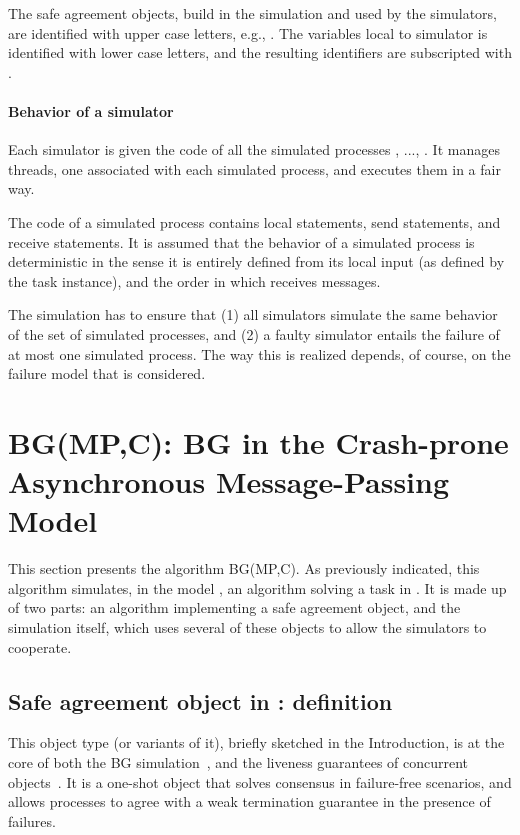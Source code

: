 \documentclass[11pt,letterpaper]{article}
\begin{document}
The safe agreement objects, build in the simulation and used by the simulators,
are identified with upper case letters, e.g., .  The  variables local to
simulator  is identified with lower case letters, and the resulting
identifiers are subscripted with .


\paragraph{Behavior of a simulator }

Each simulator is given the code of all the simulated processes
, ..., . It manages  threads, one associated with each
simulated process, and executes them in a fair way.

The code of a simulated process  contains local statements,
send statements, and receive statements. It is assumed that
the behavior of a simulated process  is deterministic in the sense
it is entirely defined from its local input (as defined by the task instance),
and the order in which   receives messages.

The simulation has to ensure that (1) all simulators simulate the
same behavior of the set of  simulated processes, and (2) a faulty simulator
entails the failure of at most one simulated process. The way
this is realized depends, of course, on the failure model that is considered.

\section{BG(MP,C): BG in the Crash-prone Asynchronous Message-Passing  Model}
\label{sec:BG-crash-model}

This section presents the algorithm BG(MP,C).
As previously indicated, this algorithm simulates, in the model  ,
an algorithm   solving a task in . It is  made up of two
parts:
an algorithm implementing a safe agreement object, and the simulation itself,
which uses several of these objects to allow the simulators to cooperate.



\subsection{Safe agreement object in : definition}
This object type (or variants of it), briefly sketched in the Introduction,
is at the core of both the BG simulation~\cite{BG93,BGLR01, G09,IR09}, and
the liveness guarantees of concurrent objects~\cite{IR11,IR11-a}.
It is a one-shot object that solves consensus in failure-free scenarios,
and allows processes to agree with  a weak termination guarantee
in the presence of failures.
\end{document}
